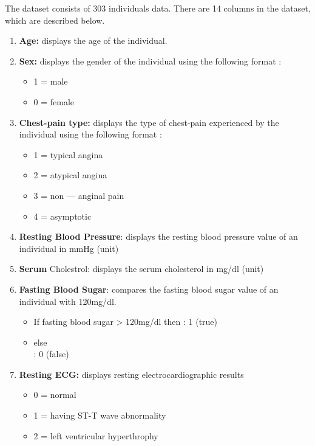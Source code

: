 \documentclass{book}
\begin{document}
  The dataset consists of 303 individuals data. There are 14 columns in the dataset, which    are described below.
  \begin{enumerate}
  	\item\textbf{Age:} displays the age of the individual.
  	
  	\item \textbf{Sex:} displays the gender of the individual using the following format :
  		\begin{itemize}
  			\item 1 = male
  			\item 0 = female
  		\end{itemize}
  	
  	\item \textbf{Chest-pain type:} displays the type of chest-pain experienced by the individual using the following format :
  		\begin{itemize}
  			\item 1 = typical angina
  			\item 2 = atypical angina
  			\item 3 = non — anginal pain
  			\item 4 = asymptotic
  		\end{itemize}
  
  	\item \textbf{Resting Blood Pressure}: displays the resting blood pressure value of an individual in mmHg (unit)
  	
  	\item \textbf{Serum} Cholestrol: displays the serum cholesterol in mg/dl (unit)
  	
  	\item \textbf{Fasting Blood Sugar}: compares the fasting blood sugar value of an individual with 120mg/dl.
  		\begin{itemize}
  			\item If fasting blood sugar > 120mg/dl then : 1 (true)
  			\item else\\ 								   : 0 (false)
  		\end{itemize}
  	
  	\item \textbf{Resting ECG:} displays resting electrocardiographic results
  	\begin{itemize}
  		\item 0 = normal
  		\item 1 = having ST-T wave abnormality
  		\item 2 = left ventricular hyperthrophy
  	\end{itemize}
  	

\end{enumerate}
\end{document}

